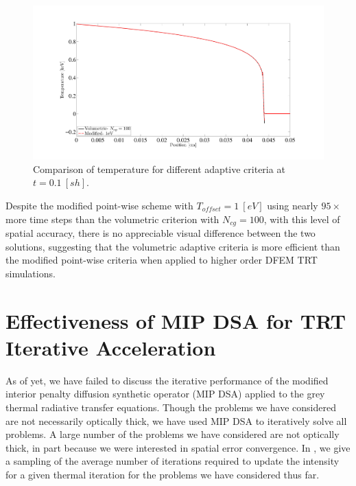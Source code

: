 \begin{figure}[!htp]
\centering
\includegraphics[width=16cm,trim=2in  0.4in 0.5in 0.75in,clip=true]{chapter6_grey_radtran/Dissertation_Data/100C_Physical_Marshak_Wave_Temperature_Adaptive_Comparison_Final_1eV.pdf}
\caption{Comparison of temperature for different adaptive criteria at $t=0.1~[sh]$.}
\label{fig:time_difference_temperature}
\end{figure}
Despite the modified point-wise scheme with $T_{offset}=1~[eV]$ using nearly $95\times$ more time steps than the volumetric criterion with $N_{cg}=100$, with this level of spatial accuracy, there is no appreciable visual difference between the two solutions, suggesting that the volumetric adaptive criteria is more efficient than the modified point-wise criteria when applied to higher order DFEM TRT simulations.

\newpage

\section{Effectiveness of MIP DSA for TRT Iterative Acceleration}
\label{sec:mip_results}

As of yet, we have failed to discuss the iterative performance of the modified interior penalty diffusion synthetic operator (MIP DSA) applied to the grey thermal radiative transfer equations.
Though the problems we have considered are not necessarily optically thick, we have used MIP DSA to iteratively solve all problems.
A large number of the problems we have considered are not optically thick, in part because we were interested in spatial error convergence.
In , we give a sampling of the average number of iterations required to update the intensity for a given thermal iteration for the problems we have considered thus far.

